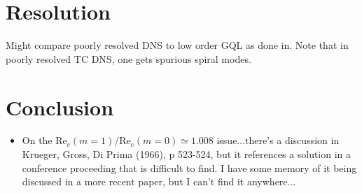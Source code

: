 \documentclass[openacc]{rstransa}%
\newcommand{\Reyn}{\mathrm{Re}}
\begin{document}
\section{Resolution}
Might compare poorly resolved DNS to low order GQL as done in\cite{2017JFM...810..412T}. Note that in poorly resolved TC DNS, one gets spurious spiral modes.





\section{Conclusion}
\label{sec:conclusion}

\begin{itemize}
    \item On the $\Reyn_c(m=1)/\Reyn_c(m=0) \simeq 1.008$ issue...there's a discussion in  Krueger, Gross, Di Prima (1966), p 523-524, but it references a solution in a conference proceeding that is difficult to find. I have some memory of it being discussed in a more recent paper, but I can't find it anywhere...
\end{itemize}
\enlargethispage{20pt}



\end{document}

